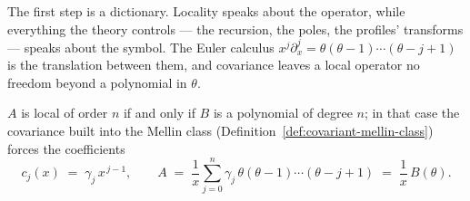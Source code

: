 The first step is a dictionary. Locality speaks about the operator, while everything the
theory controls --- the recursion, the poles, the profiles' transforms --- speaks about the
symbol. The Euler calculus $x^j\partial_x^j = \theta(\theta-1)\cdots(\theta-j+1)$ is the
translation between them, and covariance leaves a local operator no freedom beyond a
polynomial in $\theta$.

\begin{lemma}[covariant local = polynomial symbol]\label{lem:local-polynomial-symbol}
$A$ is local of order $n$ if and only if $B$ is a polynomial of degree $n$; in that case the
covariance built into the Mellin class (Definition~\ref{def:covariant-mellin-class}) forces the
coefficients
\[
  c_j(x) \;=\; \gamma_j\, x^{\,j-1}, \qquad
  A \;=\; \frac{1}{x}\sum_{j=0}^n \gamma_j\,\theta(\theta-1)\cdots(\theta-j+1)
  \;=\; \frac{1}{x}\,B(\theta).
\]
\end{lemma}

